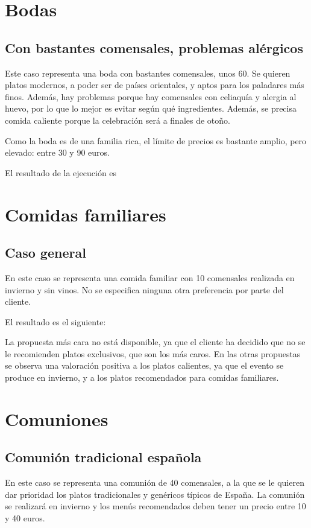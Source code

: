 % 

\section{Bodas}

\subsection{Con bastantes comensales, problemas alérgicos}
Este caso representa una boda con bastantes comensales, unos 60. Se quieren
platos modernos, a poder ser de países orientales, y aptos para los paladares
más finos. Además, hay problemas porque hay comensales con celiaquía y alergia
al huevo, por lo que lo mejor es evitar según qué ingredientes. Además, se
precisa comida caliente porque la celebración será a finales de otoño.

Como la boda es de una familia rica, el límite de precios es bastante amplio,
pero elevado: entre 30 y 90 euros.

El resultado de la ejecución es


\section{Comidas familiares}
\subsection{Caso general}
En este caso se representa una comida familiar con 10 comensales realizada en invierno y sin vinos. No se especifica ninguna otra
preferencia por parte del cliente.

El resultado es el siguiente:


La propuesta más cara no está disponible, ya que el cliente ha decidido que no se le recomienden platos exclusivos, que son los más
caros. En las otras propuestas se observa una valoración positiva a los platos calientes, ya que el evento se produce en invierno,
y a los platos recomendados para comidas familiares.

\section{Comuniones}
\subsection{Comunión tradicional española}
En este caso se representa una comunión de 40 comensales, a la que se le quieren dar prioridad los platos tradicionales y genéricos
típicos de España. La comunión se realizará en invierno y los menús recomendados deben tener un precio entre 10 y 40 euros.

